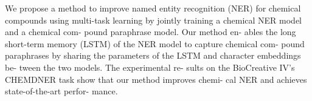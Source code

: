 We propose a method to improve named entity
recognition (NER) for chemical compounds
using multi-task learning by jointly training
a chemical NER model and a chemical com-
pound paraphrase model. Our method en-
ables the long short-term memory (LSTM)
of the NER model to capture chemical com-
pound paraphrases by sharing the parameters
of the LSTM and character embeddings be-
tween the two models. The experimental re-
sults on the BioCreative IV’s CHEMDNER
task show that our method improves chemi-
cal NER and achieves state-of-the-art perfor-
mance.